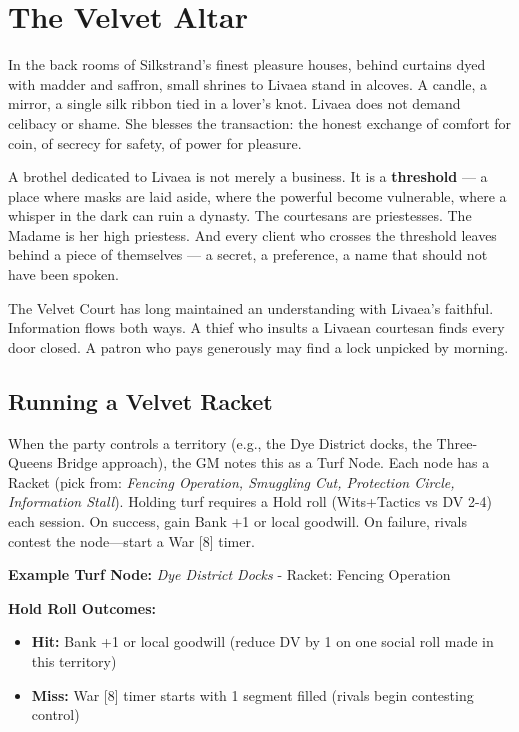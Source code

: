 \documentclass[10pt,twoside]{book}
\begin{document}
\section{The Velvet Altar}

In the back rooms of Silkstrand's finest pleasure houses, behind curtains dyed with madder and saffron, small shrines to Livaea stand in alcoves. A candle, a mirror, a single silk ribbon tied in a lover's knot. Livaea does not demand celibacy or shame. She blesses the transaction: the honest exchange of comfort for coin, of secrecy for safety, of power for pleasure.

A brothel dedicated to Livaea is not merely a business. It is a \textbf{threshold} --- a place where masks are laid aside, where the powerful become vulnerable, where a whisper in the dark can ruin a dynasty. The courtesans are priestesses. The Madame is her high priestess. And every client who crosses the threshold leaves behind a piece of themselves --- a secret, a preference, a name that should not have been spoken.

The Velvet Court has long maintained an understanding with Livaea's faithful. Information flows both ways. A thief who insults a Livaean courtesan finds every door closed. A patron who pays generously may find a lock unpicked by morning.

\subsection{Running a Velvet Racket}
When the party controls a territory (e.g., the Dye District docks, the Three-Queens Bridge approach), the GM notes this as a Turf Node. Each node has a Racket (pick from: \textit{Fencing Operation, Smuggling Cut, Protection Circle, Information Stall}). Holding turf requires a Hold roll (Wits+Tactics vs DV 2-4) each session. On success, gain Bank +1 or local goodwill. On failure, rivals contest the node---start a War [8] timer.

\noindent\textbf{Example Turf Node:}
\textit{Dye District Docks} - Racket: Fencing Operation

\noindent\textbf{Hold Roll Outcomes:}
\begin{itemize}
\item \textbf{Hit:} Bank +1 or local goodwill (reduce DV by 1 on one social roll made in this territory)
\item \textbf{Miss:} War [8] timer starts with 1 segment filled (rivals begin contesting control)
\end{itemize}
\end{document}
